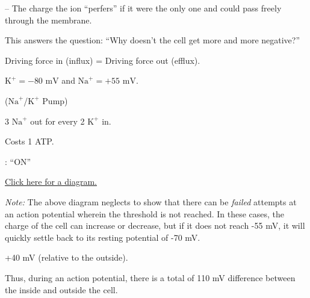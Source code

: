 \begin{coloredlist}
\begin{coloredlist}
\begin{coloredlist}
\begin{coloredlist}
                \item {} -- The charge the ion ``perfers'' if it were the only one and could pass freely through the membrane.
                \begin{coloredlist}
                    \item This answers the question: ``Why doesn't the cell get more and more negative?''
                    \item Driving force in (influx) = Driving force out (efflux).
                    \item \(\text{K}^+ = -80 \text{ mV}\) and \(\text{Na}^+ = +55 \text{ mV}\).
                \end{coloredlist}
            \end{coloredlist}
            \item {} (\(\text{Na}^{+}\)/\(\text{K}^{+}\) Pump)
            \begin{coloredlist}
                \item 3 \(\text{Na}^{+}\) out for every 2 \(\text{K}^{+}\) in.
                \item Costs 1 ATP.
            \end{coloredlist}
        \end{coloredlist}
    \end{coloredlist}
    \item {}: ``ON'' 
    \begin{coloredlist}
        \item \hyperref[action potential]{Click here for a diagram.}
        \begin{coloredlist}
            \item \textit{Note:} The above diagram neglects to show that there can be \textit{failed} attempts at an action potential wherein the threshold is not reached. In these cases, the charge of the cell can increase or decrease, but if it does not reach -55 mV, it will quickly settle back to its resting potential of -70 mV.
        \end{coloredlist}
        \item +40 mV (relative to the outside).
        \item Thus, during an action potential, there is a total of 110 mV difference between the inside and outside the cell.


\end{coloredlist}
\end{coloredlist}
